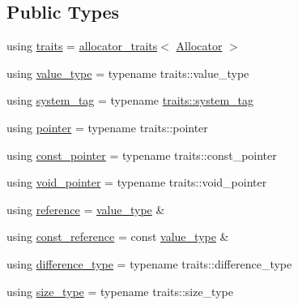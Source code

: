 \subsection*{Public Types}
\begin{DoxyCompactItemize}
\item 
using \hyperlink{structbc_1_1allocators_1_1Allocator__Forwarder_a3a50f686c87d96dfba0902fd802088c6}{traits} = \hyperlink{structbc_1_1allocators_1_1allocator__traits}{allocator\+\_\+traits}$<$ \hyperlink{classbc_1_1allocators_1_1Allocator}{Allocator} $>$
\item 
using \hyperlink{structbc_1_1allocators_1_1Allocator__Forwarder_a3ac0b07579279c948a24ee6562510dc5}{value\+\_\+type} = typename traits\+::value\+\_\+type
\item 
using \hyperlink{structbc_1_1allocators_1_1Allocator__Forwarder_a79c1e4e22d9e42518e1195f3583345f5}{system\+\_\+tag} = typename \hyperlink{structbc_1_1allocators_1_1allocator__traits_a527cf77071c45a9dcc2c8213f65f37b3}{traits\+::system\+\_\+tag}
\item 
using \hyperlink{structbc_1_1allocators_1_1Allocator__Forwarder_ae9d48fbeb22a6686ad59128cf309d8bd}{pointer} = typename traits\+::pointer
\item 
using \hyperlink{structbc_1_1allocators_1_1Allocator__Forwarder_a11939ff4b2a42e10b10cd561f5480db2}{const\+\_\+pointer} = typename traits\+::const\+\_\+pointer
\item 
using \hyperlink{structbc_1_1allocators_1_1Allocator__Forwarder_a6829b9ef6af37ad340ab8a81745760b8}{void\+\_\+pointer} = typename traits\+::void\+\_\+pointer
\item 
using \hyperlink{structbc_1_1allocators_1_1Allocator__Forwarder_abe3993f8b29d4a75bb15793f891779fe}{reference} = \hyperlink{structbc_1_1allocators_1_1Allocator__Forwarder_a3ac0b07579279c948a24ee6562510dc5}{value\+\_\+type} \&
\item 
using \hyperlink{structbc_1_1allocators_1_1Allocator__Forwarder_aaa022b1540e4d81d40d9742019c58cc4}{const\+\_\+reference} = const \hyperlink{structbc_1_1allocators_1_1Allocator__Forwarder_a3ac0b07579279c948a24ee6562510dc5}{value\+\_\+type} \&
\item 
using \hyperlink{structbc_1_1allocators_1_1Allocator__Forwarder_a672771feb1a146a20d28d59651d7a3f4}{difference\+\_\+type} = typename traits\+::difference\+\_\+type
\item 
using \hyperlink{structbc_1_1allocators_1_1Allocator__Forwarder_a254a9a5b0ac8837f64c107db7067e985}{size\+\_\+type} = typename traits\+::size\+\_\+type

\end{DoxyCompactItemize}

